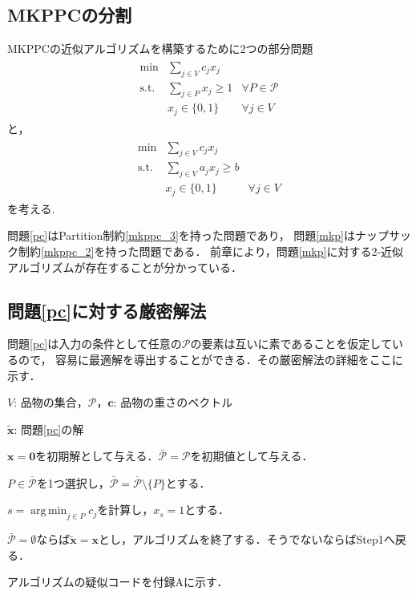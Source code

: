 \documentclass[11pt,dvipdfmx]{jarticle}
\DeclareMathOperator*{\argmin}{arg\,min}
\numberwithin{equation}{section}
\begin{document}
\subsection{MKPPCの分割}
    MKPPCの近似アルゴリズムを構築するために2つの部分問題
    \begin{align}
        \begin{array}{cll}
            \mathrm{min } & \displaystyle\sum_{j\in V}{c_jx_j}\\
            \mathrm{s.t.} & \displaystyle\sum_{j\in P}{x_j}\ge 1 & \forall P\in \mathcal{P}\\
                        & x_j \in \{0,1\} & \forall j\in V
        \end{array}
        \label{pc}
    \end{align}
    と，
    \begin{align}
        \begin{array}{cll}
            \mathrm{min } & \displaystyle\sum_{j\in V}{c_jx_j} &\\
            \mathrm{s.t.} & \displaystyle\sum_{j\in V}{a_jx_j}\ge b & \\
                    & x_j \in \{0,1\} & \forall j\in V 
        \end{array}
        \label{mkp}
    \end{align}
    を考える.\par
    問題\eqref{pc}はPartition制約\eqref{mkppc_3}を持った問題であり，
    問題\eqref{mkp}はナップサック制約\eqref{mkppc_2}を持った問題である．
    前章により，問題\eqref{mkp}に対する2-近似アルゴリズムが存在することが分かっている．

    \subsection{問題\eqref{pc}に対する厳密解法}
        問題\eqref{pc}は入力の条件として任意の$\mathcal{P}$の要素は互いに素であることを仮定しているので，
        容易に最適解を導出することができる．その厳密解法の詳細をここに示す．
        \begin{description}
            \setlength{\leftskip}{0.5cm}
            \setlength{\rightskip}{1.0cm}
            \item[Algorithm\ref{cc_alg}]
            \item[Input:] $V$: 品物の集合，$\mathcal{P}$，$\bm{c}$: 品物の重さのベクトル
            \item[Output:] $\tilde{\bm{x}}$: 問題\eqref{pc}の解
            \item[Step0:] $\bm{x}=\bm{0}$を初期解として与える．$\bar{\mathcal{P}}=\mathcal{P}$を初期値として与える．
            \item[Step1:] $P\in \bar{\mathcal{P}}$を1つ選択し，$\bar{\mathcal{P}}=\bar{\mathcal{P}}\setminus\{P\}$とする．
            \item[Step2:] $s=\displaystyle\argmin_{j\in P}{c_j}$を計算し，$x_s=1$とする．
            \item[Step3:] $\bar{\mathcal{P}}=\emptyset$ならば$\tilde{\bm{x}}=\bm{x}$とし，アルゴリズムを終了する．そうでないならばStep1へ戻る．
        \end{description}
        アルゴリズムの疑似コードを付録Aに示す．
\end{document}
